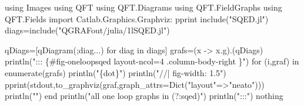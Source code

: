 \documentclass[
  11pt,
  a4paper,
  DIV=11,
  numbers=noendperiod,
  oneside]{scrreprt}
\newenvironment{Shaded}{\begin{snugshade}}{\end{snugshade}}
\newcommand{\BuiltInTok}[1]{\textcolor[rgb]{0.00,0.23,0.31}{#1}}
\newcommand{\ConstantTok}[1]{\textcolor[rgb]{0.56,0.35,0.01}{#1}}
\newcommand{\ControlFlowTok}[1]{\textcolor[rgb]{0.00,0.23,0.31}{#1}}
\newcommand{\FunctionTok}[1]{\textcolor[rgb]{0.28,0.35,0.67}{#1}}
\newcommand{\ImportTok}[1]{\textcolor[rgb]{0.00,0.46,0.62}{#1}}
\newcommand{\KeywordTok}[1]{\textcolor[rgb]{0.00,0.23,0.31}{#1}}
\newcommand{\NormalTok}[1]{\textcolor[rgb]{0.00,0.23,0.31}{#1}}
\newcommand{\OperatorTok}[1]{\textcolor[rgb]{0.37,0.37,0.37}{#1}}
\newcommand{\StringTok}[1]{\textcolor[rgb]{0.13,0.47,0.30}{#1}}
\DeclareRobustCommand{\[}{\begin{equation}}
\DeclareRobustCommand{\]}{\end{equation}}
\begin{document}
\begin{Shaded}
\begin{Highlighting}[]
\ImportTok{using} \BuiltInTok{Images}
\ImportTok{using} \BuiltInTok{QFT}
\ImportTok{using} \BuiltInTok{QFT.Diagrams}
\ImportTok{using} \BuiltInTok{QFT.FieldGraphs}
\ImportTok{using} \BuiltInTok{QFT.Fields}
\ImportTok{import}  \BuiltInTok{Catlab.Graphics.Graphviz}\NormalTok{: pprint}
\FunctionTok{include}\NormalTok{(}\StringTok{"SQED.jl"}\NormalTok{)}
\NormalTok{diags}\OperatorTok{=}\FunctionTok{include}\NormalTok{(}\StringTok{"QGRAFout/julia/1lSQED.jl"}\NormalTok{)}


\NormalTok{qDiags}\OperatorTok{=}\NormalTok{[}\FunctionTok{qDiagram}\NormalTok{(;diag}\OperatorTok{...}\NormalTok{) for diag }\KeywordTok{in}\NormalTok{ diags]}
\NormalTok{grafs}\OperatorTok{=}\NormalTok{(x }\OperatorTok{{-}\textgreater{}}\NormalTok{ x.g).(qDiags)}
\FunctionTok{println}\NormalTok{(}\StringTok{"::: \{\#fig{-}oneloopsqed  layout{-}ncol=4 .column{-}body{-}right \}"}\NormalTok{)}
\ControlFlowTok{for}\NormalTok{ (i,graf) }\KeywordTok{in} \FunctionTok{enumerate}\NormalTok{(grafs)}
\FunctionTok{println}\NormalTok{(}\StringTok{"\textasciigrave{}\textasciigrave{}\textasciigrave{}\{dot\}"}\NormalTok{)}
\FunctionTok{println}\NormalTok{(}\StringTok{"//| fig{-}width: 1.5"}\NormalTok{)}
    \FunctionTok{pprint}\NormalTok{(}\ConstantTok{stdout}\NormalTok{,}\FunctionTok{to\_graphviz}\NormalTok{(graf,graph\_attrs}\OperatorTok{=}\FunctionTok{Dict}\NormalTok{(}\StringTok{"layout"}\OperatorTok{=\textgreater{}}\StringTok{"neato"}\NormalTok{)))}
    \FunctionTok{println}\NormalTok{(}\StringTok{"\textasciigrave{}\textasciigrave{}\textasciigrave{}"}\NormalTok{)}
\ControlFlowTok{end}
\FunctionTok{println}\NormalTok{(}\StringTok{"all one loop graphs in (?:sqed)"}\NormalTok{)}
\FunctionTok{println}\NormalTok{(}\StringTok{":::"}\NormalTok{)}
\ConstantTok{nothing}
\end{Highlighting}
\end{Shaded}
\end{document}
